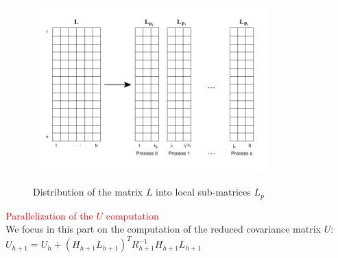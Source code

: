    \begin{figure}[htpb]
    \includegraphics[width=0.8\textwidth]{figure/p91.pdf}
    \label{l_distribution}
    \caption{Distribution of the matrix $L$ into local sub-matrices $L_p$}
  \end{figure}

  \par \textcolor{red}{Parallelization of the $U$ computation}\\

  We focus in this part on the computation of the reduced covariance matrix $U$:\\
 $ U_{h+1} = U_h +  (H_{h+1}L_{h+1})^T R_{h+1}^{-1} H_{h+1}L_{h+1}$\\


